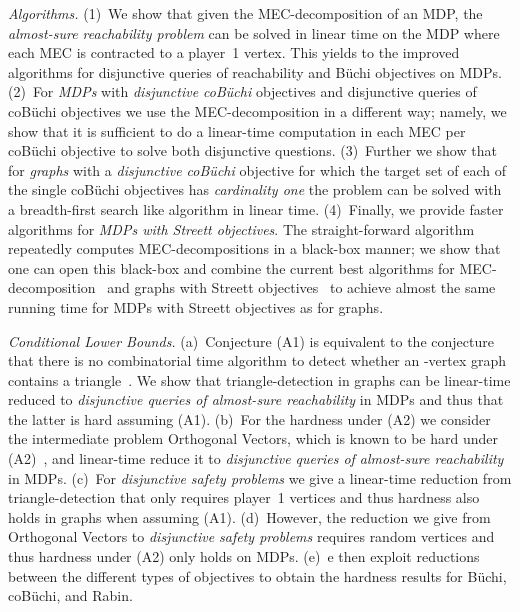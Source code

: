 \documentclass[11pt,letterpaper]{article}
\newif\iffullversion
\newcommand{\infull}[1]{\iffullversion #1\fi}
\newcommand{\inshort}[1]{\iffullversion \else #1\fi}
\begin{document}
\emph{Algorithms.}
	(1)~We show that given the MEC-decomposition of an MDP, the \emph{almost-sure reachability problem}
	can be solved in linear time on the MDP where each MEC is contracted to 
	a player~1 vertex. This yields to the improved algorithms 
	for disjunctive queries of reachability and Büchi objectives on MDPs.
(2)~For \emph{MDPs} with \emph{disjunctive coBüchi} objectives and disjunctive queries of 
	coBüchi objectives we use the MEC-decomposition in a different way;
	namely, we show that it is sufficient to do a linear-time computation in
	each MEC per coBüchi objective to solve both disjunctive questions.
(3)~Further we show that for \emph{graphs} with a 
	\emph{disjunctive coBüchi} objective for which the target set of each of the
	single coBüchi objectives has \emph{cardinality one}
	the problem can be solved with a breadth-first search like algorithm in linear time.
(4)~Finally, we provide faster algorithms for \emph{MDPs with Streett objectives}.
	The straight-forward algorithm repeatedly
	computes MEC-decompositions in a black-box manner; we show that one can 
	open this black-box and combine the current
	best algorithms for MEC-decomposition~\cite{ChatterjeeH14} and graphs with 
	Streett objectives~\cite{HenzingerT96,ChatterjeeHL15}
	to achieve almost the same running time for MDPs with Streett objectives
	as for graphs.

\emph{Conditional Lower Bounds.}
(a)~Conjecture (A1)
is equivalent to the conjecture that there is no combinatorial 
time algorithm to detect whether an -vertex graph contains a triangle~\cite{WilliamsW10}.
	We show that triangle-detection in graphs can be linear-time reduced 
	to \emph{disjunctive queries of almost-sure reachability} in MDPs and thus 
	that the latter is hard assuming (A1).
(b)~For the hardness under (A2) we consider the intermediate problem 
	Orthogonal Vectors, which is known to be hard under (A2)~\cite{Williams05},
	and linear-time reduce it to \emph{disjunctive queries of almost-sure 
	reachability} in MDPs.
(c)~For \emph{disjunctive safety problems} we give a linear-time reduction from  
	triangle-detection that only requires player~1 vertices and thus
	hardness also holds in graphs when assuming (A1).
(d)~However, the reduction we give from Orthogonal Vectors
	to \emph{disjunctive safety problems} requires random vertices and thus hardness
	under (A2) only holds on MDPs.
(e)~\infull{Based on the hardness results for {almost-sure reachability} and
	safety, w}e then exploit reductions between the different types of
	objectives to obtain the hardness results for Büchi, coBüchi,
	and Rabin.
\end{document}
